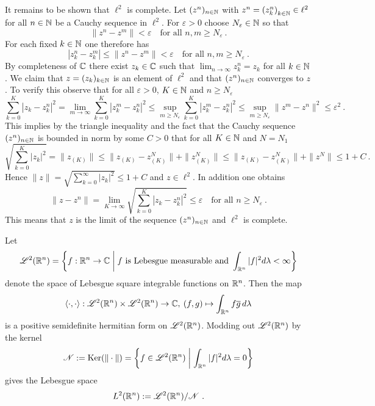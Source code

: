\begin{examples}
\begin{environmentlist}
      It remains to be shown that $\ell^2$ is complete. Let $(z^n)_{n\in \mathbb{N}}$ with $z^n = {(z^n_k)}_{k\in \mathbb{N}}\in \ell^2$
      for all $n\in \mathbb{N}$ be a Cauchy sequence in $\ell^2$.    
      For $\varepsilon >0$ choose $N_\varepsilon \in \mathbb{N}$ so that
      \[
        \| z^n - z^m   \|< \varepsilon \quad \text{for all } n,m \geq N_\varepsilon \ . 
      \]
      For each fixed $k\in \mathbb{N}$ one therefore has 
      \begin{equation}
        \label{eq:estimate-component-sequence-Cauchy-sequence-square-summable-sequences}
        | z^n_k - z^m_k | \leq \| z^n - z^m   \|< \varepsilon \quad \text{for all } n,m \geq N_\varepsilon \ . 
      \end{equation}
      By completeness of $\mathbb{C}$ there exist $z_k \in \mathbb{C}$ such that $\lim_{n\to\infty} z^n_k = z_k$ for all $k\in \mathbb{N}$. 
      We claim that $z = (z_k)_{k\in \mathbb{N}}$ is an element of $\ell^2$ and that $(z^n)_{n\in \mathbb{N}}$ converges to $z$.
      To verify this observe that for all $\varepsilon >0$, $K\in \mathbb{N}$ and $n\geq N_\varepsilon$
      \[
        \sum_{k=0}^K  | z_k - z^n_k |^2 = \lim_{m\to\infty}  \sum_{k=0}^K  | z^m_k - z^n_k |^2 
        \leq \sup_{m \geq N_\varepsilon} \sum_{k=0}^K  | z^m_k - z^n_k |^2 
        \leq \sup_{m \geq N_\varepsilon} \| z^m - z^n \|^2 \leq \varepsilon^2 \ . 
      \]
      This implies by the triangle inequality and the fact that the Cauchy sequence $(z^n)_{n\in \mathbb{N}}$ is bounded in norm by some 
      $C>0$ that for all $K\in \mathbb{N}$ and $N = N_1$
      \[
        \sqrt{\sum_{k=0}^K  | z_k|^2 } = \| z_{(K)} \| \leq  \| z_{(K)} - z^N_{(K)} \| + \| z^N_{(K)} \| 
        \leq  \| z_{(K)} - z^N_{(K)} \| + \| z^N \| 
        \leq 1 + C \ . 
      \]
      Hence $ \| z \|= \sqrt{\sum_{k=0}^\infty | z_k|^2 } \leq 1 + C $  and $z \in \ell^2$. In addition one obtains
      \[
       \| z - z^n \| = \lim_{K\to\infty} \sqrt{\sum_{k=0}^K  | z_k - z^n_k |^2} \leq \varepsilon \quad \text{for all } n \geq N_\varepsilon \ . 
      \]
      This means that $z$ is the limit of the sequence $(z^n)_{n\in \mathbb{N}}$ and $\ell^2$ is complete. 
\item Let 
      \[ 
        \mathscr{L}^2(\R^n) = \left\{ f : \R^n \to \C \suchthat f
        \text{ is Lebesgue measurable and }
        \int_{\R^n}|f|^2 d\lambda < \infty \right\}
      \] 
      denote the space of Lebesgue square integrable functions on $\mathbb{R}^n$. 
      Then the map    
      \[
          \langle \cdot , \cdot \rangle : \mathscr{L}^2(\mathbb{R}^n) \times  \mathscr{L}^2(\mathbb{R}^n) \to \mathbb{C}, \: 
         (f,g) \mapsto \int_{\mathbb{R}^n}f\overline{g}\, d\lambda
      \]
      is a positive semidefinite hermitian form on $\mathscr{L}^2(\mathbb{R}^n)$. 
      Modding out $\mathscr{L}^2(\mathbb{R}^n)$ by the kernel 
      \[ 
        \mathscr{N} := \Ker (\| \cdot \|) = 
        \left\{ f \in \mathscr{L}^2(\R^n) \suchthat \int_{\R^n}|f|^2 d\lambda = 0 \right\}
      \]
      gives the Lebesgue space
      \[
          L^2 (\R^n) := \mathscr{L}^2(\R^n) / \mathscr{N} \ .
      \]
      

\end{environmentlist}
\end{examples}
